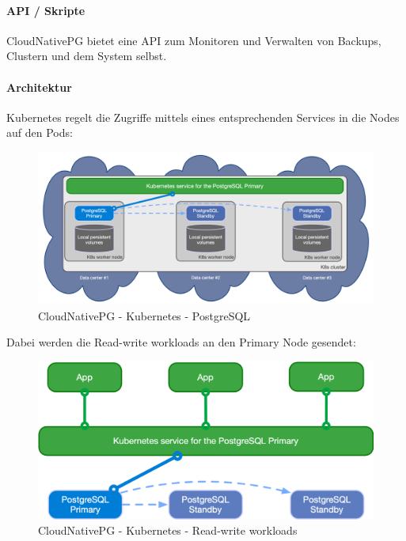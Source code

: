 \begin{flushleft}
    \paragraph{API / Skripte}
    CloudNativePG bietet eine API zum Monitoren und Verwalten von Backups, Clustern und dem System selbst\cite{L7PXKAUY}.
\end{flushleft}
\begin{flushleft}
    \paragraph{Architektur}
    Kubernetes regelt die Zugriffe mittels eines entsprechenden Services in die Nodes auf den Pods:
    \begin{figure}[H]
        \centering
        \includegraphics[width=0.75\linewidth]{source/implementation/evaluation/postgresql_ha_solutions/cloudnativepg/k8s-pg-architecture}
        \caption{CloudNativePG - Kubernetes - PostgreSQL}
        \label{fig:k8s-pg-architecture}
    \end{figure}
\end{flushleft}
\begin{flushleft}
    Dabei werden die Read-write workloads an den Primary Node gesendet:
    \begin{figure}[H]
        \centering
        \includegraphics[width=0.75\linewidth]{source/implementation/evaluation/postgresql_ha_solutions/cloudnativepg/cloudnativepg-architecture-rw}
        \caption{CloudNativePG - Kubernetes - Read-write workloads}
        \label{fig:cloudnativepg-architecture-rw}
    \end{figure}
\end{flushleft}

